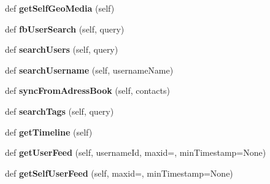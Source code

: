 \begin{DoxyCompactItemize}
def {\bfseries get\+Self\+Geo\+Media} (self)
\item 
\mbox{\label{class_instagram_a_p_i_1_1_instagram_a_p_i_1_1_instagram_a_p_i_aa2a7dce2aaf53aefb0dc685de96cca59}} 
def {\bfseries fb\+User\+Search} (self, query)
\item 
\mbox{\label{class_instagram_a_p_i_1_1_instagram_a_p_i_1_1_instagram_a_p_i_a352f330dc11540ed61d54a92302b3732}} 
def {\bfseries search\+Users} (self, query)
\item 
\mbox{\label{class_instagram_a_p_i_1_1_instagram_a_p_i_1_1_instagram_a_p_i_accef0bed1c670459127251bad8995c09}} 
def {\bfseries search\+Username} (self, username\+Name)
\item 
\mbox{\label{class_instagram_a_p_i_1_1_instagram_a_p_i_1_1_instagram_a_p_i_ac3d5bc71bdb6a5c0341b444c20024656}} 
def {\bfseries sync\+From\+Adress\+Book} (self, contacts)
\item 
\mbox{\label{class_instagram_a_p_i_1_1_instagram_a_p_i_1_1_instagram_a_p_i_aef6db05333a66b14db61742dfcdb6b80}} 
def {\bfseries search\+Tags} (self, query)
\item 
\mbox{\label{class_instagram_a_p_i_1_1_instagram_a_p_i_1_1_instagram_a_p_i_ae7ad0e5b1059ea3434d02d583cf579c2}} 
def {\bfseries get\+Timeline} (self)
\item 
\mbox{\label{class_instagram_a_p_i_1_1_instagram_a_p_i_1_1_instagram_a_p_i_a6fa9233a0122c2e0508fe20260ffa093}} 
def {\bfseries get\+User\+Feed} (self, username\+Id, maxid=\textquotesingle{}\textquotesingle{}, min\+Timestamp=None)
\item 
\mbox{\label{class_instagram_a_p_i_1_1_instagram_a_p_i_1_1_instagram_a_p_i_abba36413d2cbb4f1b0ed041bfe6661b3}} 
def {\bfseries get\+Self\+User\+Feed} (self, maxid=\textquotesingle{}\textquotesingle{}, min\+Timestamp=None)

\end{DoxyCompactItemize}
